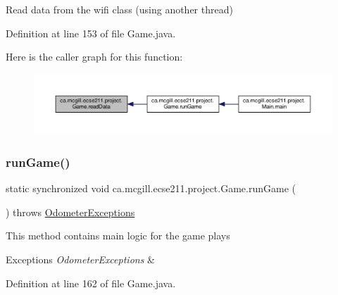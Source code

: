 Read data from the wifi class (using another thread) 

Definition at line 153 of file Game.\+java.

Here is the caller graph for this function\+:
\nopagebreak
\begin{figure}[H]
\begin{center}
\leavevmode
\includegraphics[width=350pt]{classca_1_1mcgill_1_1ecse211_1_1project_1_1_game_aff9431d27d78c8b228f468d8ad889a9a_icgraph}
\end{center}
\end{figure}
\mbox{\label{classca_1_1mcgill_1_1ecse211_1_1project_1_1_game_a790740a4ed299c9b985401ea8c4d5010}} 
\subsubsection{\texorpdfstring{run\+Game()}{runGame()}}
{\footnotesize\ttfamily static synchronized void ca.\+mcgill.\+ecse211.\+project.\+Game.\+run\+Game (\begin{DoxyParamCaption}{ }\end{DoxyParamCaption}) throws \hyperlink{classca_1_1mcgill_1_1ecse211_1_1odometer_1_1_odometer_exceptions}{Odometer\+Exceptions}\hspace{0.3cm}{\ttfamily [static]}}

This method contains main logic for the game plays


\begin{DoxyExceptions}{Exceptions}
{\em Odometer\+Exceptions} & \\
\hline
\end{DoxyExceptions}


Definition at line 162 of file Game.\+java.

